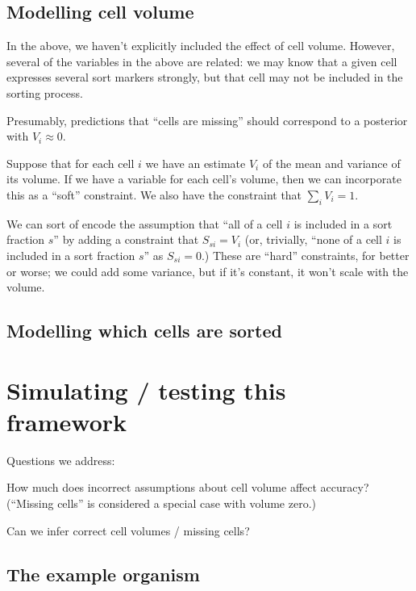 \documentclass{article}
\begin{document}
\subsection{Modelling cell volume}

In the above, we haven't explicitly included the effect of cell volume.
However, several of the variables in the above are related: we may know
that a given cell expresses several sort markers strongly, but that cell
may not be included in the sorting process.

Presumably, predictions that ``cells are missing'' should correspond to
a posterior with $V_i \approx 0$.

Suppose that for each cell $i$ we have an estimate $V_i$ of the mean and
variance of its volume. If we have a variable for each cell's volume, then
we can incorporate this as a ``soft'' constraint. We also have the constraint
that $\sum_i V_i = 1$.

We can sort of encode the assumption that ``all of a cell $i$ is included
in a sort fraction $s$'' by adding a constraint that $S_{si} = V_i$
(or, trivially, ``none of a cell $i$ is included in a sort fraction $s$''
as $S_{si} = 0$.) These are ``hard'' constraints, for better or worse;
we could add some variance, but if it's constant, it won't scale with
the volume.




\subsection{Modelling which cells are sorted}







\section{Simulating / testing this framework}


Questions we address:

How much does incorrect assumptions about cell volume affect accuracy?
(``Missing cells'' is considered a special case with volume zero.)

Can we infer correct cell volumes / missing cells?



\subsection{The example organism}
\end{document}
